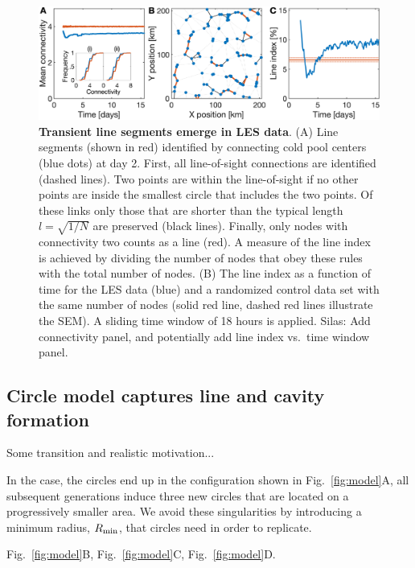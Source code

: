 \documentclass[reprint,amsmath,amssymb]{revtex4-1}
\begin{document}
\begin{figure}
\centering
\includegraphics[height=0.3\linewidth]{linesNew}
\caption{{\bf Transient line segments emerge in LES data}. (A) Line segments (shown in red) identified by connecting cold pool centers (blue dots) at day 2. First, all line-of-sight connections are identified (dashed lines). Two points are within the line-of-sight if no other points are inside the smallest circle that includes the two points. Of these links only those that are shorter than the typical length $l=\sqrt{1/N}$ are preserved (black lines). Finally, only nodes with connectivity two counts as a line (red). A measure of the line index is achieved by dividing the number of nodes that obey these rules with the total number of nodes. (B) The line index as a function of time for the LES data (blue) and a randomized control data set with the same number of nodes (solid red line, dashed red lines illustrate the SEM). A sliding time window of 18 hours is applied. {\color{red} Silas: Add connectivity panel, and potentially add line index vs.~time window panel.}}
\label{fig:lines}
\end{figure}

\subsection{Circle model captures line and cavity formation}
Some transition and realistic motivation...

In the case, the circles end up in the configuration shown in Fig.~\ref{fig:model}A, all subsequent generations induce three new circles that are located on a progressively smaller area. We avoid these singularities by introducing a minimum radius, $R_{\textnormal{min}}$, that circles need in order to replicate.

Fig.~\ref{fig:model}B, Fig.~\ref{fig:model}C, Fig.~\ref{fig:model}D.
\end{document}
